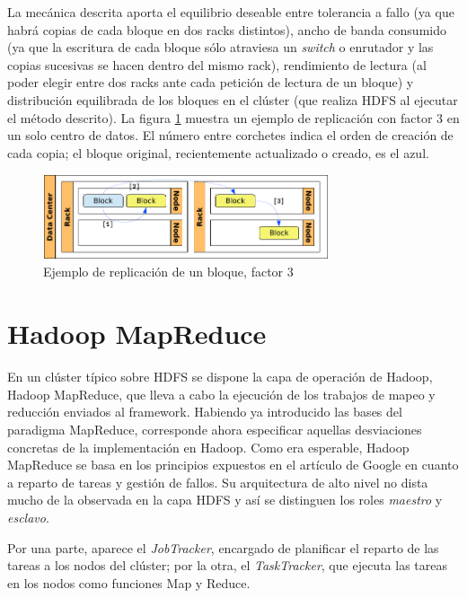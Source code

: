 La mec\'anica descrita aporta el equilibrio deseable entre tolerancia a fallo (ya que habr\'a copias de cada bloque en dos racks distintos), ancho de banda consumido (ya que la escritura de cada bloque s\'olo atraviesa un \emph{switch} o enrutador y las copias sucesivas se hacen dentro del mismo rack), rendimiento de lectura (al poder elegir entre dos racks ante cada petici\'on de lectura de un bloque) y distribuci\'on equilibrada de los bloques en el cl\'uster (que realiza HDFS al ejecutar el m\'etodo descrito). La figura \ref{fig:repbloque} muestra un ejemplo de replicaci\'on con factor 3 en un solo centro de datos. El n\'umero entre corchetes indica el orden de creaci\'on de cada copia; el bloque original, recientemente actualizado o creado, es el azul.

\begin{figure}[tbp]
\begin{center}
\includegraphics[width=0.75\textwidth]{imagenes/019.pdf}
 \caption{Ejemplo de replicaci\'on de un bloque, factor 3}
\label{fig:repbloque}
\end{center}
\end{figure}


\section{Hadoop MapReduce}\label{sec:hadoopmapred}
\noindent En un cl\'uster t\'ipico sobre HDFS se dispone la capa de operaci\'on de Hadoop, Hadoop MapReduce, que lleva a cabo la ejecuci\'on de los trabajos de mapeo y reducci\'on enviados al framework. Habiendo ya introducido las bases del paradigma MapReduce, corresponde ahora especificar aquellas desviaciones concretas de la implementaci\'on en Hadoop. Como era esperable, Hadoop MapReduce se basa en los principios expuestos en el art\'iculo de Google \cite{googlemapreduce} en cuanto a reparto de tareas y gesti\'on de fallos. Su arquitectura de alto nivel no dista mucho de la observada en la capa HDFS y as\'i se distinguen los roles \emph{maestro} y \emph{esclavo}.\newline

Por una parte, aparece el \emph{JobTracker}, encargado de planificar el reparto de las tareas a los nodos del cl\'uster; por la otra, el \emph{TaskTracker}, que ejecuta las tareas en los nodos como funciones Map y Reduce.\newline

